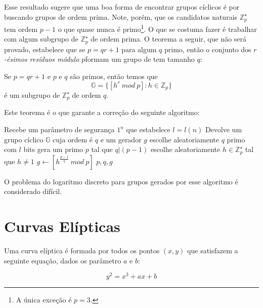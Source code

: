 Esse resultado sugere que uma boa forma de encontrar grupos cíclicos é por buscando grupos de ordem prima.
Note, porém, que os candidatos naturais $\mathbb{Z}_p^\star$ tem ordem $p - 1$ o que quase nunca é primo\footnote{A única exceção é $p = 3$.}.
O que se costuma fazer é trabalhar com algum subgrupo de $\mathbb{Z}_p^\star$ de ordem prima.
O teorema a seguir, que não será provado, estabelece que se $p = qr + 1$ para algum $q$ primo, então o conjunto dos {\em $r$-ésimos resíduos módulo $p$}formam um grupo de tem tamanho $q$:

\begin{theorem}
Se $p = qr + 1$ e $p$ e $q$ são primos, então temos que
\begin{displaymath}
  \mathbb{G} = \{[h^r\ mod\ p] : h \in \mathbb{Z}_p\}
\end{displaymath}
é um subgrupo de $\mathbb{Z}_p^\star$ de ordem $q$.
\end{theorem}
   
Este teorema é o que garante a correção do seguinte algoritmo:

\begin{codebox}
\li \Comment Recebe um parâmetro de segurança $1^n$ que estabelece $l = l(n)$
\li \Comment Devolve um grupo cíclico $\mathbb{G}$ cuja ordem é $q$ e um gerador $g$
\li escolhe aleatoriamente $q$ primo com $l$ bits
\li gera um primo $p$ tal que $q|(p-1)$
\li escolhe aleatoriamente $h \in \mathbb{Z}_p^\star$ tal que $h \neq 1$ 
\li $g \gets [h^{\frac{p-1}{q}}\ mod\ p]$
\li \Return $p, q, g$
\end{codebox}

O problema do logaritmo discreto para grupos gerados por esse algoritmo é considerado difícil.

\section{Curvas Elípticas}
\label{sec:curvas-elipticas}

Uma curva elíptica é formada por todos os pontos $(x,y)$ que satisfazem a seguinte equação, dados os parâmetro $a$ e $b$:

\begin{displaymath}
  y^2 = x^3 + ax + b 
\end{displaymath}

